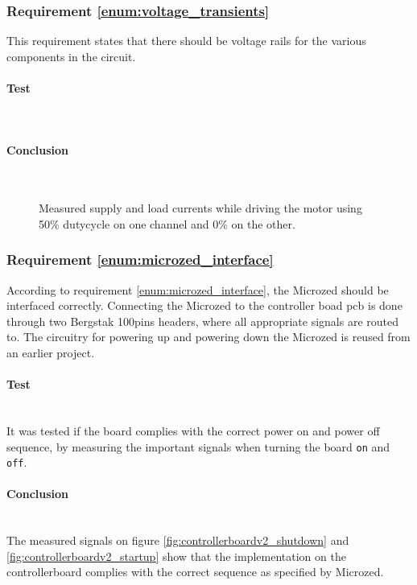 \subsubsection{Requirement \ref{enum:voltage_transients}} %
\label{ssub:requirement_enum:voltage_transients}
This requirement states that there should be voltage rails for the various components in the circuit.

\paragraph{Test}~\\

\paragraph{Conclusion}~\\
\begin{figure}[h]
	\centering
    
	\caption[Measured supply and load currents.]{Measured supply and load currents while driving the motor using 50\% dutycycle on one channel and 0\% on the other.}
	\label{fig:controllerboardv2_}
\end{figure}

\subsubsection{Requirement \ref{enum:microzed_interface}} %
\label{ssub:requirement_enum:microzed_interface}
According to requirement  \ref{enum:microzed_interface}, the Microzed should be interfaced correctly.
Connecting the Microzed to the controller boad pcb is done through two Bergstak 100pins headers, where all appropriate signals are routed to.
The circuitry for powering up and powering down the Microzed is reused from an earlier project.

\paragraph{Test}~\\
It was tested if the board complies with the correct power on and power off sequence, by measuring the important signals when turning the board \texttt{on} and \texttt{off}.

\paragraph{Conclusion}~\\
The measured signals on figure \ref{fig:controllerboardv2_shutdown} and \ref{fig:controllerboardv2_startup} show that the implementation on the controllerboard complies with the correct sequence as specified by Microzed.


